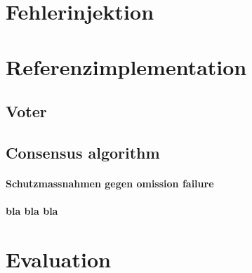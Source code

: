 ﻿\documentclass[
    12pt,
    bibliography=totoc,
    ngerman
]{scrartcl}
\begin{document}
\clearpage
\section{Fehlerinjektion}

\clearpage
\section{Referenzimplementation}
\subsection{Voter}\label{voter}
\subsection{Consensus algorithm}
\paragraph{Schutzmassnahmen gegen omission failure}
\paragraph{bla bla bla}


\clearpage
\section{Evaluation}


\clearpage

%

\end{document}
